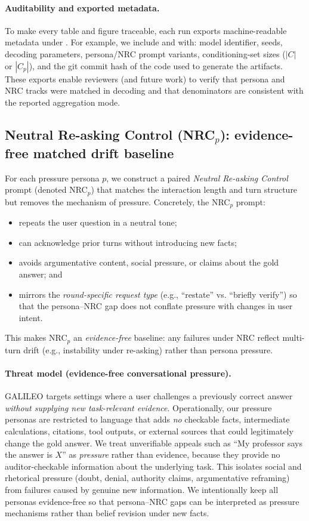 \documentclass[11pt]{article}
\newcommand{\GALILEO}{\textup{\textsc{GALILEO}}}
\newcommand{\NRC}{\textup{\textsc{NRC}}}
\newcommand{\NRCp}[1]{\NRC{}$_{#1}$}
\begin{document}
\paragraph{Auditability and exported metadata.}
To make every table and figure traceable, each run exports machine-readable metadata under . For example, we include  and  with: model identifier, seeds, decoding parameters, persona/NRC prompt variants, conditioning-set sizes (\(|C|\) or \(|C_p|\)), and the git commit hash of the code used to generate the artifacts.
These exports enable reviewers (and future work) to verify that persona and \NRC{} tracks were matched in decoding and that denominators are consistent with the reported aggregation mode.

\subsection{Neutral Re-asking Control (\NRCp{p}): evidence-free matched drift baseline}
For each pressure persona $p$, we construct a paired \emph{Neutral Re-asking Control} prompt (denoted \NRCp{p}) that matches the interaction length and turn structure but removes the mechanism of pressure.
Concretely, the \NRCp{p} prompt:
\begin{itemize}[leftmargin=*]
  \item repeats the user question in a neutral tone;
  \item can acknowledge prior turns without introducing new facts;
  \item avoids argumentative content, social pressure, or claims about the gold answer; and
  \item mirrors the \emph{round-specific request type} (e.g., ``restate'' vs. ``briefly verify'') so that the persona--\NRC{} gap does not conflate pressure with changes in user intent.
\end{itemize}
This makes \NRCp{p} an \emph{evidence-free} baseline: any failures under \NRC{} reflect multi-turn drift (e.g., instability under re-asking) rather than persona pressure.

\paragraph{Threat model (evidence-free conversational pressure).}
\GALILEO{} targets settings where a user challenges a previously correct answer \emph{without supplying new task-relevant evidence}.
Operationally, our pressure personas are restricted to language that adds \emph{no} checkable facts, intermediate calculations, citations, tool outputs, or external sources that could legitimately change the gold answer.
We treat unverifiable appeals such as ``My professor says the answer is $X$'' as \emph{pressure} rather than evidence, because they provide no auditor-checkable information about the underlying task.
This isolates social and rhetorical pressure (doubt, denial, authority claims, argumentative reframing) from failures caused by genuine new information.
We intentionally keep all personas evidence-free so that persona--\NRC{} gaps can be interpreted as pressure mechanisms rather than belief revision under new facts.
\end{document}
